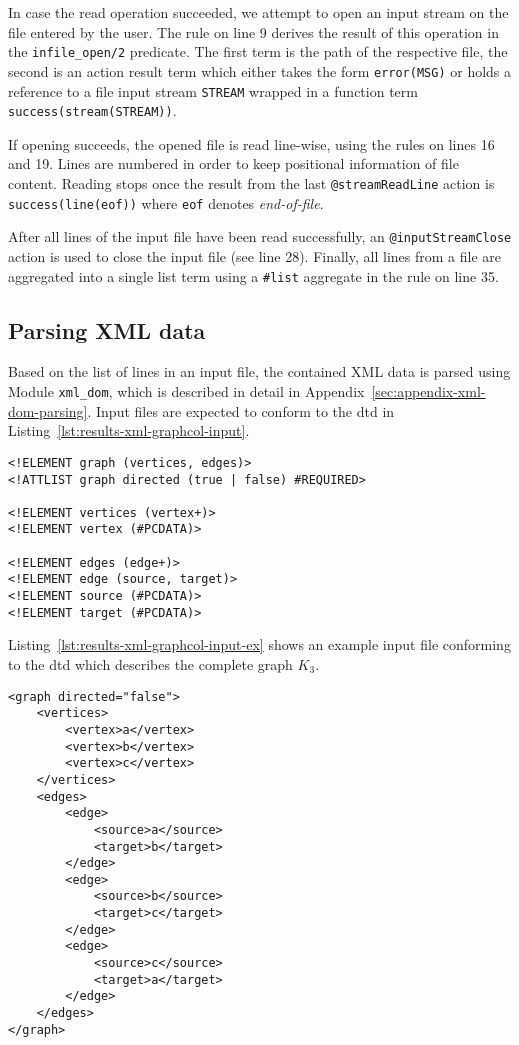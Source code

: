In case the read operation succeeded, we attempt to open an input stream on the file entered by the user. The rule on line 9 derives the result of this operation in the \texttt{infile\_open/2} predicate. The first term is the path of the respective file, the second is an action result term which either takes the form \texttt{error(MSG)} or holds a reference to a file input stream \texttt{STREAM} wrapped in a function term \texttt{success(stream(STREAM))}.

If opening succeeds, the opened file is read line-wise, using the rules on lines 16 and 19. Lines are numbered in order to keep positional information of file content. Reading stops once the result from the last \texttt{@streamReadLine} action is \texttt{success(line(eof))} where \texttt{eof} denotes \emph{end-of-file}.

After all lines of the input file have been read successfully, an \texttt{@inputStreamClose} action is used to close the input file (see line 28). Finally, all lines from a file are aggregated into a single list term using a \texttt{\#list} aggregate in the rule on line 35.

\subsection{Parsing XML data}
\label{subsec:results-xml-parsing}

Based on the list of lines in an input file, the contained XML data is parsed using Module \texttt{xml\_dom}, which is described in detail in Appendix~\ref{sec:appendix-xml-dom-parsing}. Input files are expected to conform to the \gls{dtd} in Listing~\ref{lst:results-xml-graphcol-input}.

\begin{lstlisting}[style=asp-code, label={lst:results-xml-graphcol-input}, caption={\gls{dtd} for graph XML files.}]  
<!ELEMENT graph (vertices, edges)>
<!ATTLIST graph directed (true | false) #REQUIRED>

<!ELEMENT vertices (vertex+)>
<!ELEMENT vertex (#PCDATA)>

<!ELEMENT edges (edge+)>
<!ELEMENT edge (source, target)>
<!ELEMENT source (#PCDATA)>
<!ELEMENT target (#PCDATA)>    
\end{lstlisting}    

Listing~\ref{lst:results-xml-graphcol-input-ex} shows an example input file conforming to the \gls{dtd} which describes the complete graph $K_3$.

\begin{lstlisting}[style=asp-code, label={lst:results-xml-graphcol-input-ex}, caption={The complete graph $K_3$ represented according to the \gls{dtd} from Listing~\ref{lst:results-xml-graphcol-input}.}]
<graph directed="false">
    <vertices>
        <vertex>a</vertex>
        <vertex>b</vertex>
        <vertex>c</vertex>
    </vertices>
    <edges>
        <edge>
            <source>a</source>
            <target>b</target>
        </edge>
        <edge>
            <source>b</source>
            <target>c</target>
        </edge>
        <edge>
            <source>c</source>
            <target>a</target>
        </edge>
    </edges>    
</graph>
\end{lstlisting} 

